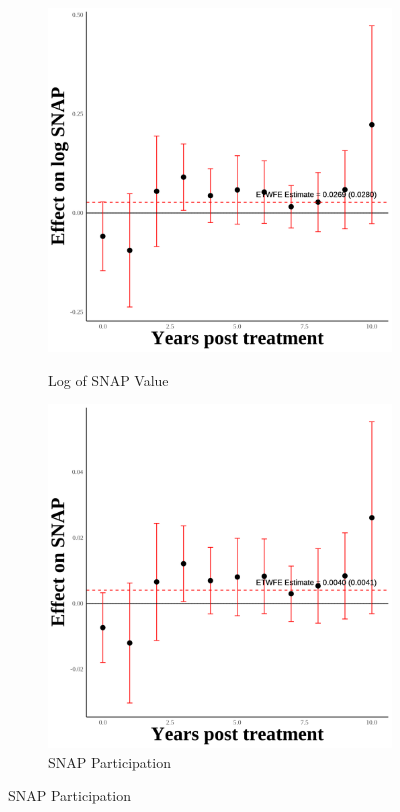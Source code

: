 \documentclass[12pt,english]{article}
\begin{document}
\begin{figure}[H]
  \vspace{0.3cm} %

  \begin{subfigure}[b]{0.3\textwidth}
    \centering
    \caption{Log of SNAP Value}
    \includegraphics[width=\linewidth]{figures/plot60-ln_snap_event_study-third-one.png}
    \label{fig:ln-snap-third-one}
  \end{subfigure}
  \hfill
  \begin{subfigure}[b]{0.3\textwidth}
    \centering
    \caption{SNAP Participation}
    \includegraphics[width=\linewidth]{figures/plot61-snap_event_study-third-one.png}

\end{subfigure}
\end{figure}
\end{document}
